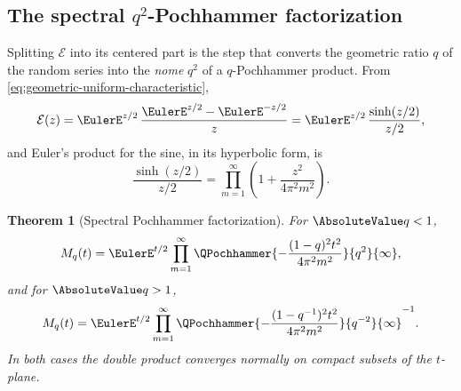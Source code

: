 \documentclass[11pt,a4paper,oneside,openany]{book}
\newtheorem{theorem}{Theorem}[chapter]
\theoremstyle{definition}
\theoremstyle{remark}
\begin{document}
\subsection{The spectral \texorpdfstring{$q^2$}{q2}-Pochhammer factorization}

Splitting $\mathcal E$ into its centered part is the step that converts the
geometric ratio $q$ of the random series into the \emph{nome} $q^2$ of a
$q$-Pochhammer product.  From \eqref{eq:geometric-uniform-characteristic},
\begin{equation}\label{eq:qF-Ecal-centered}
 \mathcal E(z)
 =\EulerE^{z/2}\,\frac{\EulerE^{z/2}-\EulerE^{-z/2}}{z}
 =\EulerE^{z/2}\,\frac{\sinh(z/2)}{z/2},
\end{equation}
and Euler's product for the sine, in its hyperbolic form, is
\begin{equation}\label{eq:qF-sinh-product}
 \frac{\sinh(z/2)}{z/2}
 =\prod_{m=1}^{\infty}\left(1+\frac{z^2}{4\pi^2m^2}\right).
\end{equation}

\begin{theorem}[Spectral Pochhammer factorization]\label{thm:qF-spectral}
For $\AbsoluteValue q<1$,
\begin{equation}\label{eq:qF-spectral-inside}
 M_q(t)=\EulerE^{t/2}\prod_{m=1}^{\infty}
 \QPochhammer{-\dfrac{(1-q)^2t^2}{4\pi^2m^2}}{q^2}{\infty},
\end{equation}
and for $\AbsoluteValue q>1$,
\begin{equation}\label{eq:qF-spectral-outside}
 M_q(t)=\EulerE^{t/2}\prod_{m=1}^{\infty}
 \QPochhammer{-\dfrac{(1-q^{-1})^2t^2}{4\pi^2m^2}}{q^{-2}}{\infty}^{-1}.
\end{equation}
In both cases the double product converges normally on compact subsets of the
$t$-plane.
\end{theorem}
\end{document}
